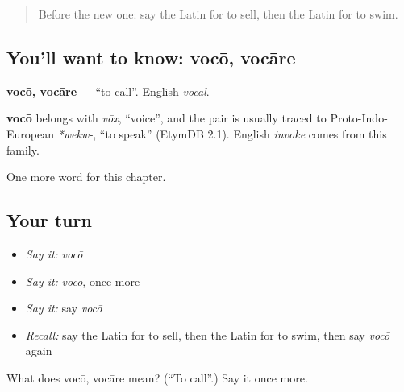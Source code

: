\label{lesson:LA-C76-voco}



\begin{quote}
Before the new one: say the Latin for to sell, then the Latin for to swim.
\end{quote}

\subsection*{You'll want to know: vocō, vocāre}
\textbf{vocō, vocāre} — \textquotedblleft{}to call\textquotedblright{}. English \emph{vocal}.

\begin{cousinweb}
\textbf{vocō} belongs with \emph{vōx}, \textquotedblleft{}voice\textquotedblright{}, and the pair is usually traced to Proto-Indo-European \emph{*wekw-}, \textquotedblleft{}to speak\textquotedblright{} (EtymDB 2.1). English \emph{invoke} comes from this family.
\end{cousinweb}

\begin{grammarlens}[title={What you've built}]
One more word for this chapter.
\end{grammarlens}

\subsection*{Your turn}
\begin{itemize}
\raggedright
  \item \emph{Say it:} \emph{vocō}
  \item \emph{Say it:} \emph{vocō}, once more
  \item \emph{Say it:} say \emph{vocō}
  \item \emph{Recall:} say the Latin for to sell, then the Latin for to swim, then say \emph{vocō} again
\end{itemize}

\begin{tcolorbox}[breakable,colback=teal!4,colframe=teal!35!black,title={Before you move on}]
What does vocō, vocāre mean? (\textquotedblleft{}To call\textquotedblright{}.) Say it once more.
\end{tcolorbox}
